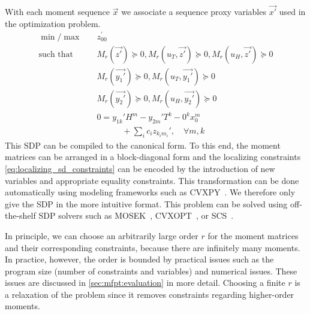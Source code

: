 With each moment sequence $\vec x$ we associate a sequence proxy variables $\vec{x'}$
used in the optimization problem.
\begin{equation}\label{eq:sdp_for_fpt}
    \begin{split}
        \min / \max \hspace{1em}&  z_{00}^{\prime} \\
        \text{such that}\hspace{1em} & M_r(\vec{z'})\succeq 0,
                   M_r({u}_T, \vec{z'})\succeq 0, M_r({u}_H, \vec{z'})\succeq 0\\
        & M_r(\vec{y_1'}) \succeq 0, M_r({u}_T,\vec{y_1'}) \succeq 0\\
        & M_r(\vec{y_2'}) \succeq 0, M_r({u}_H, \vec{y_2'}) \succeq 0\\
        & 0= y_{1k}' H^m -  y_{2m}'T^k - 0^k x_0^m \\
	    &\qquad\quad+\sum_i c_i  z_{k_i m_i}', \quad\forall m, k
    \end{split}
\end{equation}
This \ac{SDP} can be compiled to the canonical form.
To this end, the moment matrices can be arranged in a block-diagonal form and the
localizing constraints \eqref{eq:localizing_sd_constraints} can be encoded
by the introduction of new variables and appropriate equality constraints.
This transformation can be done automatically using modeling frameworks
such as CVXPY~\cite{cvxpy}. We therefore only give the \ac{SDP} in the more intuitive format.
This problem can be solved using off-the-shelf \ac{SDP} solvers such as MOSEK~\cite{mosek},
CVXOPT~\cite{vandenberghe2010cvxopt}, or SCS~\cite{scs}.

In principle, we can choose an arbitrarily large order $r$ for the moment matrices
and their corresponding constraints, because there are
infinitely many moments.
In practice, however, the order is bounded by practical issues such as the program size
(number of constraints and variables) and numerical issues.
These issues are discussed in \autoref{sec:mfpt:evaluation} in more detail.
Choosing a finite $r$ is a relaxation of the problem since it removes constraints regarding
higher-order moments.


